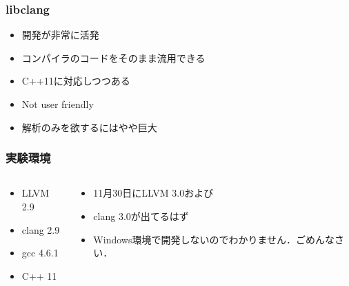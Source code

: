 \documentclass[12pt,xgraphicx=dvips,xcolor=dvips]{beamer}
\begin{document}
\begin{frame}
  \frametitle{libclang}

  \begin{description}[Cons.]
    \setlength{\itemsep}{1.5zh}
    \item[Pros.]
      \begin{itemize}
        \setlength{\itemsep}{0.75zh}
        \item 開発が非常に活発
        \item コンパイラのコードをそのまま流用できる
        \item C++11に対応しつつある
      \end{itemize}
    \item[Cons.]
      \begin{itemize}
        \setlength{\itemsep}{0.75zh}
        \item Not user friendly
        \item 解析のみを欲するにはやや巨大
      \end{itemize}
  \end{description}
\end{frame}

\begin{frame}
  \frametitle{実験環境}

  \begin{columns}

    \begin{column}[t]{.40\textwidth}
      \begin{itemize}
        \setlength{\itemsep}{1.5zh}
        \item LLVM 2.9
        \item clang 2.9
        \item gcc 4.6.1
        \item C++ 11
      \end{itemize}
    \end{column}

    \pause

    \begin{column}[t]{.40\textwidth}
      \begin{itemize}
        \setlength{\itemsep}{1.5zh}
        \item 11月30日にLLVM 3.0および
        \item clang 3.0が出てるはず
        \item Windows環境で開発しないのでわかりません．ごめんなさい．
      \end{itemize}
    \end{column}
  \end{columns}

\end{frame}
\end{document}
